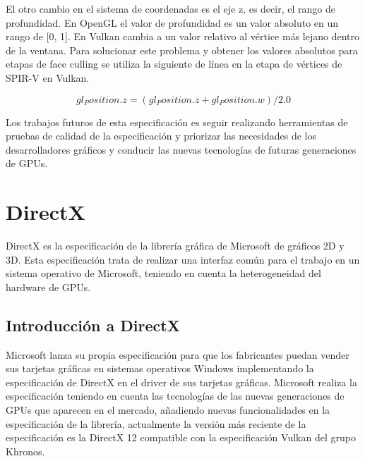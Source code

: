 \documentclass[a4paper, 17pt]{book}
\begin{document}
\vspace{1mm} %

El otro cambio en el sistema de coordenadas es el eje z, es decir, el rango de profundidad. En OpenGL el valor de profundidad
es un valor absoluto en un rango de [0, 1]. En Vulkan cambia a un valor relativo al vértice más lejano dentro de la ventana.
Para solucionar este problema y obtener los valores absolutos para etapas de face culling se utiliza la siguiente de línea
en la etapa de vértices de SPIR-V en Vulkan. 

\begin{equation}
gl_Position.z = (gl_Position.z + gl_Position.w) / 2.0
\end{equation}

Los trabajos futuros de esta especificación es seguir realizando herramientas de pruebas de calidad de la especificación
y priorizar las necesidades de los desarrolladores gráficos y conducir las nuevas tecnologías de futuras
generaciones de GPUs.

\section{DirectX} 
\label{sec:DirectX}

DirectX es la especificación de la librería gráfica de Microsoft de gráficos 2D y 3D. Esta especificación trata de realizar
una interfaz común para el trabajo en un sistema operativo de Microsoft, teniendo en cuenta la heterogeneidad del hardware de GPUs.

\subsection{Introducción a DirectX} 
\label{subsec:IntroDirectX}

Microsoft lanza su propia especificación para que los fabricantes puedan vender sus tarjetas gráficas en sistemas operativos Windows
implementando la especificación de DirectX en el driver de sus tarjetas gráficas. Microsoft realiza la especificación teniendo en
cuenta las tecnologías de las nuevas generaciones de GPUs que aparecen en el mercado, añadiendo nuevas funcionalidades en la
especificación de la librería, actualmente la versión más reciente de la especificación es la DirectX 12 compatible con la
especificación Vulkan del grupo Khronos.

\vspace{1mm} %
\end{document}
